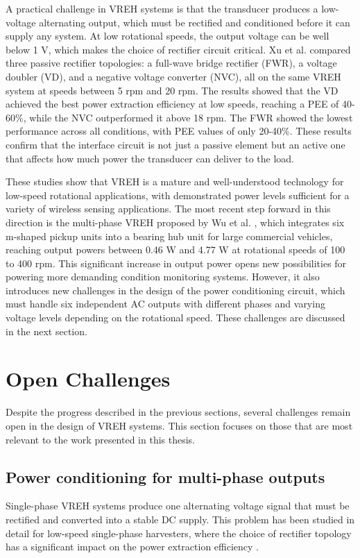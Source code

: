 A practical challenge in VREH systems is that the
transducer produces a low-voltage alternating output,
which must be rectified and conditioned before it can
supply any system. At low rotational speeds, the output
voltage can be well below 1 V, which makes the choice of
rectifier circuit critical. Xu et
al. \cite{xuSystemImplementationTradeOffs2021} compared three
passive rectifier topologies: a full-wave bridge
rectifier (FWR), a voltage doubler (VD), and a negative
voltage converter (NVC), all on the same VREH system at
speeds between 5 rpm and 20 rpm. The results showed
that the VD achieved the best power extraction efficiency
at low speeds, reaching a PEE of 40-60\%, while the NVC
outperformed it above 18 rpm. The FWR showed the lowest
performance across all conditions, with PEE values of only
20-40\%. These results confirm that the interface circuit
is not just a passive element but an active one that affects how
much power the transducer can deliver to the load.

These studies show that VREH is a mature
and well-understood technology for low-speed rotational
applications, with demonstrated power levels sufficient
for a variety of wireless sensing applications. The most recent
step forward in this direction is the multi-phase VREH
proposed by Wu et al. \cite{wuMultiPhaseVariableReluctance2024}, which
integrates six m-shaped pickup units into a bearing hub
unit for large commercial vehicles, reaching output powers
between 0.46 W and 4.77 W at rotational speeds of
100 to 400 rpm. This significant increase in output power
opens new possibilities for powering more demanding
condition monitoring systems. However, it also introduces
new challenges in the design of the power conditioning
circuit, which must handle six independent AC outputs
with different phases and varying voltage levels depending
on the rotational speed. These challenges are discussed in
the next section.


\section{Open Challenges}


Despite the progress described in the previous sections,
several challenges remain open in the design of VREH
systems. This section focuses on those that are most
relevant to the work presented in this thesis.

\subsection*{Power conditioning for multi-phase outputs}
Single-phase VREH systems produce one alternating
voltage signal that must be rectified and converted into a
stable DC supply. This problem has been studied in detail
for low-speed single-phase harvesters, where the choice
of rectifier topology has a significant impact on the
power extraction efficiency \cite{xuSystemImplementationTradeOffs2021}.


